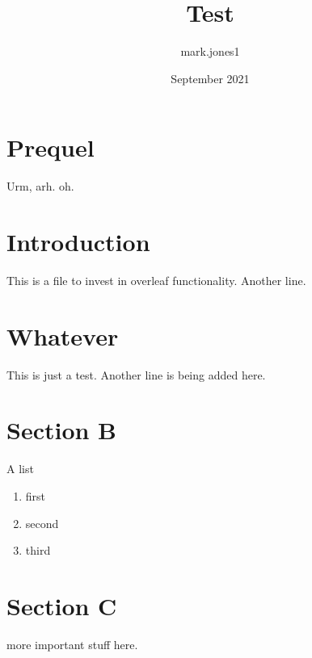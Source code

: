 \documentclass{article}
\title{Test}
\author{mark.jones1 }
\date{September 2021}
\begin{document}
\maketitle

\section{Prequel}

Urm, arh. oh.


\section{Introduction}

This is a file to invest in overleaf functionality.
Another line.

\section{Whatever}

This is just a test.
Another line is being added here.

\section{Section B}

A list

\begin{enumerate}
    \item first
    \item second
    \item third
\end{enumerate}


\section{Section C}

more important stuff here.
\end{document}
